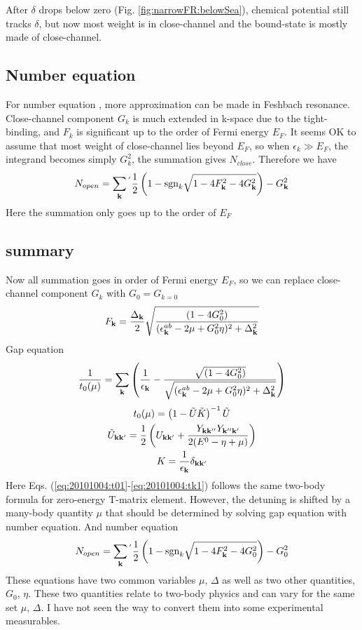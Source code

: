 \documentclass{article}
\begin{document}
After $\delta$ drops below zero (Fig. \ref{fig:narrowFR:belowSea}), chemical potential still tracks $\delta$, but now most weight is in close-channel and the bound-state is mostly made of close-channel.  

\subsection{Number equation}
For number equation , more approximation can be made in Feshbach resonance.  Close-channel component $G_{k}$ is much extended in k-space due to the tight-binding, and $F_{k}$ is significant up to the order of Fermi energy $E_{F}$.  It seems OK to assume that most weight of close-channel lies beyond $E_{F}$, so when $\epsilon_{k}\gg{E_{F}}$, the integrand becomes simply $G_{k}^{2}$, the summation gives $N_{close}$.  Therefore we have 
\begin{equation}\label{eq:20100909:number}
N_{open}=\sum_{\mathbf{k}}{}^{'}\frac{1}{2} \left(1-\text{sgn}_{k}\sqrt{1-4 F_{\mathbf{k}}^2-4 G_{\mathbf{k}}^2}\right)-G_{\mathbf{k}}^{2}
\end{equation} 
Here the summation only goes up to the order of $E_{F}$

\subsection{summary}
Now all summation goes in order of Fermi energy $E_F$, so we can replace close-channel component $G_k$ with $G_0=G_{k=0}$
\begin{equation}
F_{\mathbf{k}}=\frac{\Delta_{\mathbf{k}}}2\sqrt{\frac{(1-4G_{0}^{2})}{(\epsilon^{ab}_{\mathbf{k}}-2\mu+  G_{0}^2\eta)^{2}+\Delta_{\mathbf{k}}^{2}}}
\end{equation}
Gap equation 
\begin{equation}\label{eq:20101004:renormGap1}
\frac{1}{{t_{0}}(\mu)}=\sum_{\mathbf{k}}
\left(\frac{1}{\epsilon_{\mathbf{k}}}-\frac{\sqrt{(1-4G_{0}^{2})}}{\sqrt{{(\epsilon^{ab}_{\mathbf{k}}-2\mu+  G_{0}^2\eta)^{2}+\Delta_{\mathbf{k}}^{2}}}}\right)
\end{equation} 
\begin{gather}
{t_{0}}(\mu)=\left(1-\tilde{U}\tilde{ K}\right)^{-1}\tilde{U}\label{eq:20101004:t01}\\
\tilde{U}_{\mathbf{k}\mathbf{k}'}=\frac{1}{2} \left(U_{\mathbf{k}\mathbf{k}'}+\frac{Y_{\mathbf{k}\mathbf{k}''}Y_{\mathbf{k}''\mathbf{k}'}}{2(E^{0}-\eta+\mu)}\right)\label{eq:20101004:tu1}\\
{K}=\frac{1}{\epsilon_{\mathbf{k}}}\delta_{\mathbf{k}\mathbf{k}'}\label{eq:20101004:tk1}
\end{gather}
Here Eqs. (\ref{eq:20101004:t01}-\ref{eq:20101004:tk1}) follows the same two-body formula for zero-energy T-matrix element.  However, the detuning is shifted by a many-body quantity $\mu$ that should be determined by solving gap equation with number equation.  
And number equation
\begin{equation}\label{eq:20100909:number}
N_{open}=\sum_{\mathbf{k}}{}^{'}\frac{1}{2} \left(1-\text{sgn}_{k}\sqrt{1-4 F_{\mathbf{k}}^2-4 G_{0}^2}\right)-G_{0}^{2}
\end{equation} 
These equations have two common variables $\mu$, $\Delta$ as well as two other quantities, $G_0$, $\eta$.  These two quantities relate to  two-body physics and can vary for the same set $\mu$, $\Delta$.  I have not seen the way to convert them into some experimental measurables.  


\end{document}
